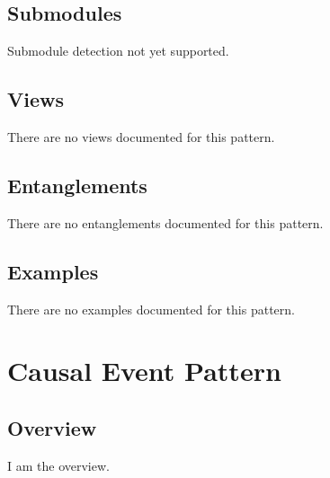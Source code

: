 \subsection{Submodules}
\label{ssec:submodules}
Submodule detection not yet supported.

\subsection{Views}
\label{ssec:views}
There are no views documented for this pattern.


\subsection{Entanglements}
\label{ssec:entanglements}
There are no entanglements documented for this pattern.

\subsection{Examples}
\label{ssec:examples}
There are no examples documented for this pattern.


\section{Causal Event Pattern}
\label{sec:causal-event-pattern}
\subsection{Overview}
\label{ssec:overview}
I am the overview.

